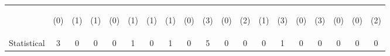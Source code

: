 \begin{tabular}{lcccccccccccccccccc}
 & \begin{footnotesize}(0)\end{footnotesize} & \begin{footnotesize}(1)\end{footnotesize} & \begin{footnotesize}(1)\end{footnotesize} & \begin{footnotesize}(0)\end{footnotesize} & \begin{footnotesize}(1)\end{footnotesize} & \begin{footnotesize}(1)\end{footnotesize} & \begin{footnotesize}(1)\end{footnotesize} & \begin{footnotesize}(0)\end{footnotesize} & \begin{footnotesize}(3)\end{footnotesize} & \begin{footnotesize}(0)\end{footnotesize} & \begin{footnotesize}(2)\end{footnotesize} & \begin{footnotesize}(1)\end{footnotesize} & \begin{footnotesize}(3)\end{footnotesize} & \begin{footnotesize}(0)\end{footnotesize} & \begin{footnotesize}(3)\end{footnotesize} & \begin{footnotesize}(0)\end{footnotesize} & \begin{footnotesize}(0)\end{footnotesize} & \begin{footnotesize}(2)\end{footnotesize}\\
\noalign{\smallskip}Statistical & 3 & 0 & 0 & 0 & 1 & 0 & 1 & 0 & 5 & 0 & 0 & 0 & 1 & 0 & 0 & 0 & 0 & 0\\

\end{tabular}
